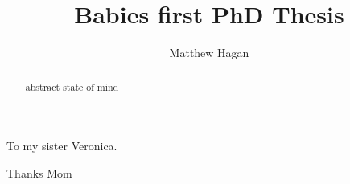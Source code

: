 \documentclass{ut-thesis}
\author{Matthew Hagan}
\title{Babies first PhD Thesis}
\begin{document}
  \frontmatter
    \maketitle
    \begin{abstract}
      abstract state of mind
    \end{abstract}
    \begin{dedication}
      To my sister Veronica.
    \end{dedication}
    \begin{acknowledgements}
      Thanks Mom
    \end{acknowledgements}
    \tableofcontents
    \listoftables
    \listoffigures
  \mainmatter
    
    
    
    
    
  \appendix
  
  \backmatter
  \printbibliography[heading=bibintoc]
\end{document}
